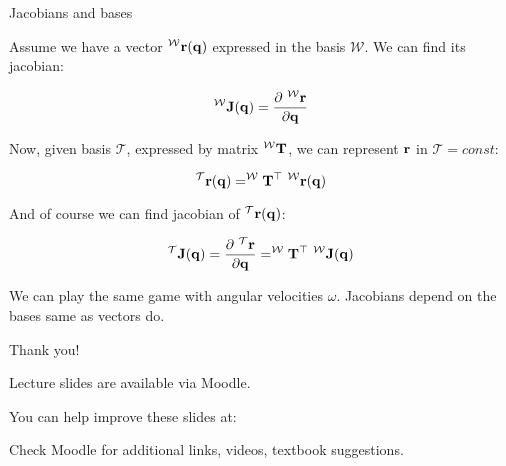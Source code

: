 \documentclass{beamer}
\begin{document}
\begin{frame}{Jacobians and bases}
	\begin{flushleft}
		
		Assume we have a vector $^{\mathcal W}\mathbf{r}(\mathbf{q})$ expressed in the basis $\mathcal W$. We can find its jacobian:
		
		\begin{equation}
			^{\mathcal W}\mathbf{J}(\mathbf{q}) = \frac{\partial \ ^{\mathcal W}\mathbf{r}}{\partial \mathbf{q}}
		\end{equation}
		
		Now, given basis $\mathcal T$, expressed by matrix $^{\mathcal W} \mathbf{T}$, we can represent $\mathbf{r}$ in $\mathcal T = const$:
		
		\begin{equation}
	^{\mathcal T}\mathbf{r}(\mathbf{q}) = ^{\mathcal W} \mathbf{T}^\top \ ^{\mathcal W}\mathbf{r}(\mathbf{q})
		\end{equation}		
	
	And of course we can find jacobian of $^{\mathcal T}\mathbf{r}(\mathbf{q})$:
	
		\begin{equation}
	^{\mathcal T}\bo{J}(\bo{q}) = \frac{\partial \ ^{\mathcal T}\bo{r}}{\partial \bo{q}}
	=
	^{\mathcal W} \bo{T}\T \ 
	^{\mathcal W}\bo{J}(\bo{q})
		\end{equation}	
	
	We can play the same game with angular velocities $\omega$. Jacobians depend on the bases same as vectors do.
		
	\end{flushleft}
\end{frame}


\begin{frame}{Thank you!}
\centerline{Lecture slides are available via Moodle.}
\bigskip
\centerline{You can help improve these slides at:}
\centerline{\mygit}
\bigskip
\centerline{Check Moodle for additional links, videos, textbook suggestions.}
\bigskip

\centerline{\textcolor{black}{}}

\end{frame}
\end{document}
